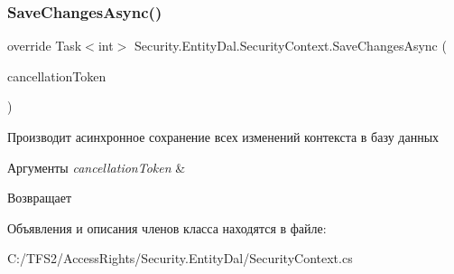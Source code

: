 \subsubsection{\texorpdfstring{Save\+Changes\+Async()}{SaveChangesAsync()}}
{\footnotesize\ttfamily override Task$<$int$>$ Security.\+Entity\+Dal.\+Security\+Context.\+Save\+Changes\+Async (\begin{DoxyParamCaption}\item[{Cancellation\+Token}]{cancellation\+Token }\end{DoxyParamCaption})}



Производит асинхронное сохранение всех изменений контекста в базу данных 


\begin{DoxyParams}{Аргументы}
{\em cancellation\+Token} & \\
\hline
\end{DoxyParams}
\begin{DoxyReturn}{Возвращает}

\end{DoxyReturn}


Объявления и описания членов класса находятся в файле\+:\begin{DoxyCompactItemize}
\item 
C\+:/\+T\+F\+S2/\+Access\+Rights/\+Security.\+Entity\+Dal/Security\+Context.\+cs\end{DoxyCompactItemize}
